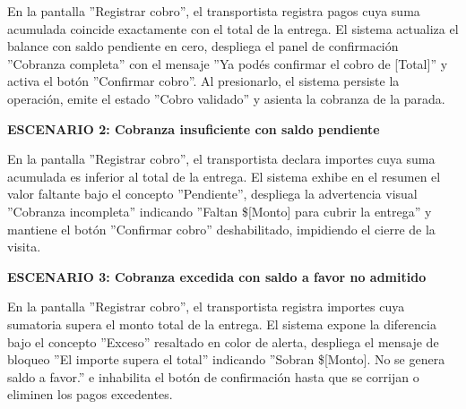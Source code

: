 \documentclass[a4paper,9pt]{article}
\begin{document}
\begin{tcolorbox}[hucard, title={\textbf{HU-32: VALIDAR COBRO ÍNTEGRO} \hfill \scriptsize \colorbox{amberstatus}{\textbf{\ Ready for test\ }} \quad \colorbox{white}{\textcolor{primarydark}{\textbf{\ 3 pts\ }}}}]
{En la pantalla ''Registrar cobro'', el transportista registra pagos cuya suma acumulada coincide exactamente con el total de la entrega. El sistema actualiza el balance con saldo pendiente en cero, despliega el panel de confirmación ''Cobranza completa'' con el mensaje ''Ya podés confirmar el cobro de [Total]'' y activa el botón ''Confirmar cobro''. Al presionarlo, el sistema persiste la operación, emite el estado ''Cobro validado'' y asienta la cobranza de la parada.\par\vspace{2.5pt}
\noindent\textbf{\textcolor{secondarydark}{ESCENARIO 2:  Cobranza insuficiente con saldo pendiente}}\par\vspace{1pt}
En la pantalla ''Registrar cobro'', el transportista declara importes cuya suma acumulada es inferior al total de la entrega. El sistema exhibe en el resumen el valor faltante bajo el concepto ''Pendiente'', despliega la advertencia visual ''Cobranza incompleta'' indicando ''Faltan \$[Monto] para cubrir la entrega'' y mantiene el botón ''Confirmar cobro'' deshabilitado, impidiendo el cierre de la visita.\par\vspace{2.5pt}
\noindent\textbf{\textcolor{secondarydark}{ESCENARIO 3:  Cobranza excedida con saldo a favor no admitido}}\par\vspace{1pt}
En la pantalla ''Registrar cobro'', el transportista registra importes cuya sumatoria supera el monto total de la entrega. El sistema expone la diferencia bajo el concepto ''Exceso'' resaltado en color de alerta, despliega el mensaje de bloqueo ''El importe supera el total'' indicando ''Sobran \$[Monto]. No se genera saldo a favor.'' e inhabilita el botón de confirmación hasta que se corrijan o eliminen los pagos excedentes.\par\vspace{2.5pt}
}\par
\end{tcolorbox}
\end{document}
